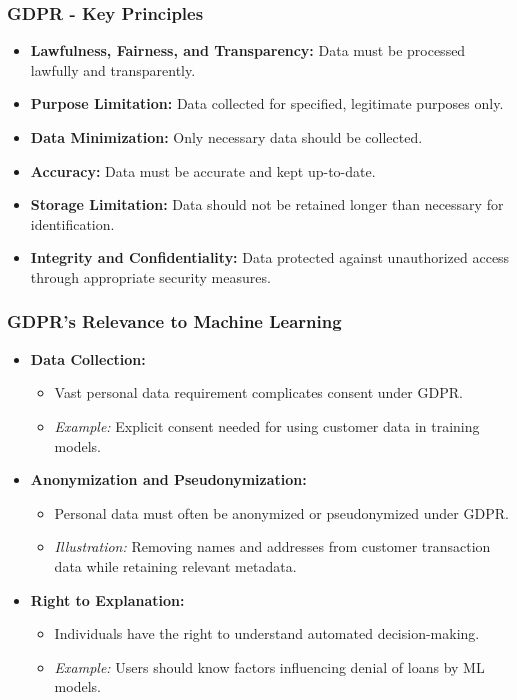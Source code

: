 \documentclass[aspectratio=169]{beamer}
\begin{document}
\begin{frame}[fragile]
    \frametitle{GDPR - Key Principles}
    
    \begin{itemize}
        \item \textbf{Lawfulness, Fairness, and Transparency:} Data must be processed lawfully and transparently.
        \item \textbf{Purpose Limitation:} Data collected for specified, legitimate purposes only.
        \item \textbf{Data Minimization:} Only necessary data should be collected.
        \item \textbf{Accuracy:} Data must be accurate and kept up-to-date.
        \item \textbf{Storage Limitation:} Data should not be retained longer than necessary for identification.
        \item \textbf{Integrity and Confidentiality:} Data protected against unauthorized access through appropriate security measures.
    \end{itemize}
\end{frame}

\begin{frame}[fragile]
    \frametitle{GDPR's Relevance to Machine Learning}
    
    \begin{itemize}
        \item \textbf{Data Collection:} 
            \begin{itemize}
                \item Vast personal data requirement complicates consent under GDPR.
                \item \textit{Example:} Explicit consent needed for using customer data in training models.
            \end{itemize}
        \item \textbf{Anonymization and Pseudonymization:}
            \begin{itemize}
                \item Personal data must often be anonymized or pseudonymized under GDPR.
                \item \textit{Illustration:} Removing names and addresses from customer transaction data while retaining relevant metadata.
            \end{itemize}
        \item \textbf{Right to Explanation:}
            \begin{itemize}
                \item Individuals have the right to understand automated decision-making.
                \item \textit{Example:} Users should know factors influencing denial of loans by ML models.
            \end{itemize}
    \end{itemize}
\end{frame}
\end{document}

